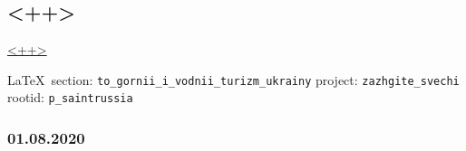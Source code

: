  
 
\subsection{<++>}
\url{<++>}
  
\vspace{0.5cm}
{\small\LaTeX~section: \verb|to_gornii_i_vodnii_turizm_ukrainy| project: \verb|zazhgite_svechi| rootid: \verb|p_saintrussia|}
\vspace{0.5cm}

\subsubsection{01.08.2020}

